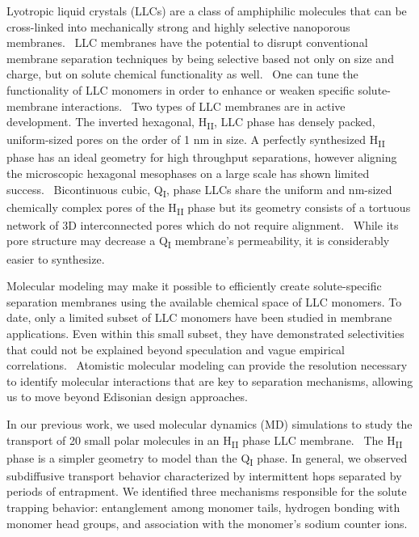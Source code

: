 \documentclass{article}
\begin{document}
  Lyotropic liquid crystals (LLCs) are a class of amphiphilic molecules that can be 
  cross-linked into mechanically strong and highly selective nanoporous membranes.~\cite{gin_polymerized_2008}
  LLC membranes have the potential to disrupt conventional membrane separation techniques by 
  being selective based not only on size and charge, but on solute chemical functionality
  as well.~\cite{dischinger_application_2017} One can tune the functionality of LLC monomers
  in order to enhance or weaken specific solute-membrane interactions.~\cite{dischinger_effect_2017}
  Two types of LLC membranes are in active development. The inverted hexagonal, 
  H\textsubscript{II}, LLC phase has densely packed, uniform-sized pores on the order of 1 nm
  in size. A perfectly synthesized H\textsubscript{II} phase has an ideal geometry for high
  throughput separations, however aligning the microscopic hexagonal mesophases on a large 
  scale has shown limited success.~\cite{feng_scalable_2014,feng_thin_2016} Bicontinuous cubic,
  Q\textsubscript{I}, phase LLCs share the uniform and nm-sized chemically complex pores of
  the H\textsubscript{II} phase but its geometry consists of a tortuous network of 3D 
  interconnected pores which do not require alignment.~\cite{carter_glycerol-based_2012} While 
  its pore structure may decrease a Q\textsubscript{I} membrane's permeability, it is considerably
  easier to synthesize.
  
  Molecular modeling may make it possible to efficiently create solute-specific separation
  membranes using the available chemical space of LLC monomers. To date, only a limited 
  subset of LLC monomers have been studied in membrane applications.
  \cite{carter_glycerol-based_2012,hatakeyama_nanoporous_2010,smith_ordered_1997,zhou_assembly_2003,resel_structural_2000}
  Even within this small subset, they have demonstrated selectivities that could not be
  explained beyond speculation and vague empirical correlations.~\cite{dischinger_application_2017}
  Atomistic molecular modeling can provide the resolution necessary to identify molecular 
  interactions that are key to separation mechanisms, allowing us to move beyond 
  Edisonian design approaches.

  In our previous work, we used molecular dynamics (MD) simulations to study the transport
  of 20 small polar molecules in an H\textsubscript{II} phase LLC membrane.~\cite{coscia_chemically_2019}
  The H\textsubscript{II} phase is a simpler geometry to model than the Q\textsubscript{I} phase.  
  In general, we observed subdiffusive transport behavior characterized by intermittent hops 
  separated by periods of entrapment. We identified three mechanisms responsible for the 
  solute trapping behavior: entanglement among monomer tails, hydrogen bonding with monomer
  head groups, and association with the monomer's sodium counter ions.
  
\end{document}
